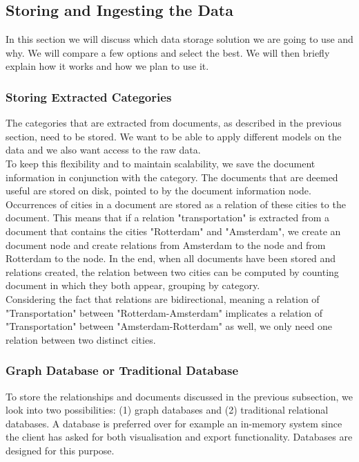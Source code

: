 \subsection{Storing and Ingesting the Data}
In this section we will discuss which data storage solution we are going to use and why. We will compare a few options and select the best. We will then briefly explain how it works and how we plan to use it.

\subsubsection{Storing Extracted Categories}
The categories that are extracted from documents, as described in the previous section, need to be stored. We want to be able to apply different models on the data and we also want access to the raw data. \\
To keep this flexibility and to maintain scalability, we save the document information in conjunction with the category. The documents that are deemed useful are stored on disk, pointed to by the document information node. Occurrences of cities in a document are stored as a relation of these cities to the document. This means that if a relation "transportation" is extracted from a document that contains the cities "Rotterdam" and "Amsterdam", we create an document node and create relations from Amsterdam to the node and from Rotterdam to the node. In the end, when all documents have been stored and relations created, the relation between two cities can be computed by counting document in which they both appear, grouping by category. \\
Considering the fact that relations are bidirectional, meaning a relation of "Transportation" between "Rotterdam-Amsterdam" implicates a relation of "Transportation" between "Amsterdam-Rotterdam" as well, we only need one relation between two distinct cities.

\subsubsection{Graph Database or Traditional Database}
To store the relationships and documents discussed in the previous subsection, we look into two possibilities: (1) graph databases and (2) traditional relational databases. A database is preferred over for example an in-memory system since the client has asked for both visualisation and export functionality. Databases are designed for this purpose.

